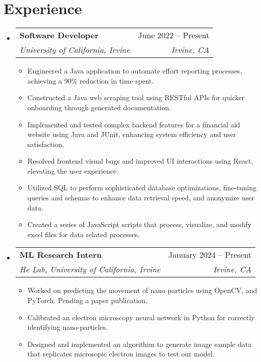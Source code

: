 \documentclass[letterpaper,11pt]{article}
\makeatletter
\newcommand{\resumeItem}[1]{
  \item\small{
    {#1 \vspace{-2pt}}
  }
}
\newcommand{\resumeSubheading}[4]{
  \vspace{-2pt}\item
    \begin{tabular*}{0.97\textwidth}[t]{l@{\extracolsep{\fill}}r}
      \textbf{#1} & #2 \\
      \textit{\small#3} & \textit{\small #4} \\
    \end{tabular*}\vspace{-7pt}
}
\newcommand{\resumeSubSubheading}[2]{
    \item
    \begin{tabular*}{0.97\textwidth}{l@{\extracolsep{\fill}}r}
      \textit{\small#1} & \textit{\small #2} \\
    \end{tabular*}\vspace{-7pt}
}
\newcommand{\resumeSubHeadingListStart}{\begin{itemize}[leftmargin=0.15in, label={}]}
\newcommand{\resumeSubHeadingListEnd}{\end{itemize}}
\newcommand{\resumeItemListStart}{\begin{itemize}}
\newcommand{\resumeItemListEnd}{\end{itemize}\vspace{-5pt}}
\makeatother
\begin{document}
\section{Experience}
  \resumeSubHeadingListStart

    \resumeSubheading
      {Software Developer}{June 2022 -- Present}
      {University of California, Irvine}{Irvine, CA}
      \resumeItemListStart
        \resumeItem{Engineered a Java application to automate effort reporting processes, achieving a 90\% reduction in time spent.}
        \resumeItem{Constructed a Java web scraping tool using RESTful APIs for quicker onboarding through generated documentation.
        }
        \resumeItem{Implemented and tested complex backend features for a financial aid website using Java and JUnit, enhancing system efficiency and user satisfaction.
        }
        \resumeItem{Resolved frontend visual bugs and improved UI interactions using React, elevating the user experience. 
        }
        \resumeItem{Utilized SQL to perform sophisticated database optimizations, fine-tuning queries and schemas to enhance data retrieval speed, and anonymize user data.
        }
        \resumeItem{Created a series of JavaScript scripts that process, visualize, and modify excel files for data related processes.}
      \resumeItemListEnd
    \resumeSubheading
      {ML Research Intern}{January 2024 -- Present}
      {He Lab, University of California, Irvine}{Irvine, CA}
      \resumeItemListStart
        \resumeItem{Worked on predicting the movement of nano particles using OpenCV, and PyTorch. Pending a paper publication.}
        \resumeItem{Calibrated an electron microscopy neural network in Python for correctly identifying nano-particles.
        }
        \resumeItem{Designed and implemented an algorithim to generate image sample data that replicates microsopic electron images to test our model. 
        }
      \resumeItemListEnd
      

  \resumeSubHeadingListEnd


\end{document}
